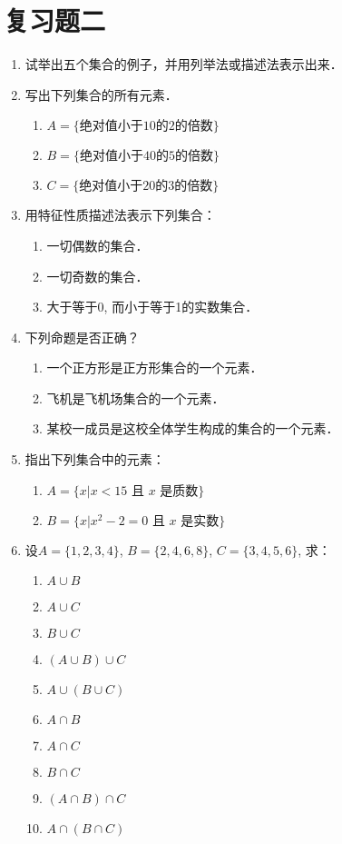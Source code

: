 \section*{复习题二}
\begin{enumerate}
	\item 试举出五个集合的例子，并用列举法或描述法表示出来．
	\item 写出下列集合的所有元素．
\begin{enumerate}
	\item $A=\{\text{绝对值小于10的2的倍数}\}$
	\item $B=\{\text{绝对值小于40的5的倍数}\}$
	\item $C=\{\text{绝对值小于20的3的倍数}\}$
\end{enumerate}

\item 用特征性质描述法表示下列集合：
\begin{enumerate}
	\item 一切偶数的集合．
	\item 一切奇数的集合．
	\item 大于等于0, 而小于等于1的实数集合．
\end{enumerate}

\item 下列命题是否正确？
\begin{enumerate}
	\item 一个正方形是正方形集合的一个元素．
	\item 飞机是飞机场集合的一个元素．
	\item 某校一成员是这校全体学生构成的集合的一个元素．
\end{enumerate}

\item 指出下列集合中的元素：
\begin{enumerate}
	\item $A=\{x|x<15\text{ 且 $x$ 是质数}\}$
	\item $B=\{x|x^2-2=0\text{ 且 $x$ 是实数}\}$
\end{enumerate}

\item 设$A=\{1,2,3,4\}$, $B=\{ 2,4,6,8\}$, $C=\{3,4,5,6\}$, 求：
\begin{multicols}{4}
\begin{enumerate}
	\item $A\cup B$
	\item $A\cup C$
	\item $B\cup C$
	\item $(A\cup B)\cup C$
	\item $A\cup (B\cup C)$
	\item $A\cap B$
	\item $A\cap C$
	\item $B\cap C$
	\item $(A\cap B)\cap C$
	\item $A\cap (B\cap C)$
\end{enumerate}	
\end{multicols}



\end{enumerate}
